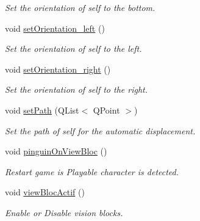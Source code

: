\begin{DoxyCompactItemize}
\begin{DoxyCompactList}\small\item\em Set the orientation of self to the bottom. \end{DoxyCompactList}\item 
\hypertarget{class_ennemi_ac455b7c41a46dc42a27841b9c566e329}{}void \hyperlink{class_ennemi_ac455b7c41a46dc42a27841b9c566e329}{set\+Orientation\+\_\+left} ()\label{class_ennemi_ac455b7c41a46dc42a27841b9c566e329}

\begin{DoxyCompactList}\small\item\em Set the orientation of self to the left. \end{DoxyCompactList}\item 
\hypertarget{class_ennemi_a4e99225c7a632efceebba66996d7d9ee}{}void \hyperlink{class_ennemi_a4e99225c7a632efceebba66996d7d9ee}{set\+Orientation\+\_\+right} ()\label{class_ennemi_a4e99225c7a632efceebba66996d7d9ee}

\begin{DoxyCompactList}\small\item\em Set the orientation of self to the right. \end{DoxyCompactList}\item 
\hypertarget{class_ennemi_a482e9c5ccc0cf1c3aa4e83f32f3eedb1}{}void \hyperlink{class_ennemi_a482e9c5ccc0cf1c3aa4e83f32f3eedb1}{set\+Path} (Q\+List$<$ Q\+Point $>$)\label{class_ennemi_a482e9c5ccc0cf1c3aa4e83f32f3eedb1}

\begin{DoxyCompactList}\small\item\em Set the path of self for the automatic displacement. \end{DoxyCompactList}\item 
void \hyperlink{class_ennemi_a6811b0a25a92ec210750072b83d1f74e}{pinguin\+On\+View\+Bloc} ()
\begin{DoxyCompactList}\small\item\em Restart game is Playable character is detected. \end{DoxyCompactList}\item 
\hypertarget{class_ennemi_ad4861b8a3ad9d4819d3716ac3d0e8501}{}void \hyperlink{class_ennemi_ad4861b8a3ad9d4819d3716ac3d0e8501}{view\+Bloc\+Actif} ()\label{class_ennemi_ad4861b8a3ad9d4819d3716ac3d0e8501}

\begin{DoxyCompactList}\small\item\em Enable or Disable vision blocks. \end{DoxyCompactList}\end{DoxyCompactItemize}
